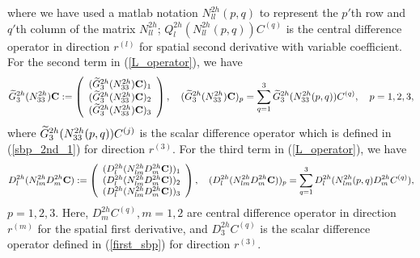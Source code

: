 where we have used a matlab notation $N_{ll}^{2h}(p,q)$ to represent the $p'$th row and $q'$th column of the matrix $N_{ll}^{2h}$; $Q_l^{2h}(N_{ll}^{2h}(p,q)){ C}^{(q)}$ is the central difference operator in direction $r^{(l)}$ for spatial second derivative with variable coefficient. For the second term in (\ref{L_operator}), we have
\begin{align*}
\widetilde{{G}}_3^{2h}({N}_{33}^{2h}){\bf C} := \left(\begin{array}{c}
(\widetilde{{G}}_3^{2h}({N}_{33}^{2h}){\bf C})_1 \\
(\widetilde{{G}}_3^{2h}({N}_{33}^{2h}){\bf C})_2 \\
(\widetilde{{G}}_3^{2h}({N}_{33}^{2h}){\bf C})_3 
\end{array}\right), \quad (\widetilde{{G}}_3^{2h}({N}_{33}^{2h}){\bf C})_p = \sum_{q = 1}^{3} \widetilde{G}_3^{2h}(N_{33}^{2h}(p,q)) {C}^{(q)},\quad p = 1,2,3,
\end{align*}
where $\widetilde{G}_3^{2h}(N_{33}^{2h}(p,q)) { C}^{(j)}$ is the scalar difference operator which is defined in (\ref{sbp_2nd_1}) for direction $r^{(3)}$. For the third term in (\ref{L_operator}), we have
\begin{align*}
{D}_l^{2h}({N}_{lm}^{2h}{D}_m^{2h}{\bf C}) := \left(\begin{array}{c}
(D^{2h}_l(N^{2h}_{lm}D_m^{2h}{\bf C}))_1 \\
(D^{2h}_l(N^{2h}_{lm}D_m^{2h}{\bf C}))_2 \\
(D^{2h}_l(N^{2h}_{lm}D_m^{2h}{\bf C}))_3 
\end{array}\right), \quad (D^{2h}_l(N^{2h}_{lm}D_m^{2h}{\bf C}))_p = \sum_{q = 1}^{3} D^{2h}_l(N^{2h}_{lm}(p,q)D_m^{2h}{C}^{(q)}),
\end{align*}
$p = 1,2,3$. Here, $D_m^{2h}C^{(q)}, m = 1,2$ are central difference operator in direction $r^{(m)}$ for the spatial first derivative, and $D_3^{2h}C^{(q)}$ is the scalar difference operator defined in (\ref{first_sbp}) for direction $r^{(3)}$.

